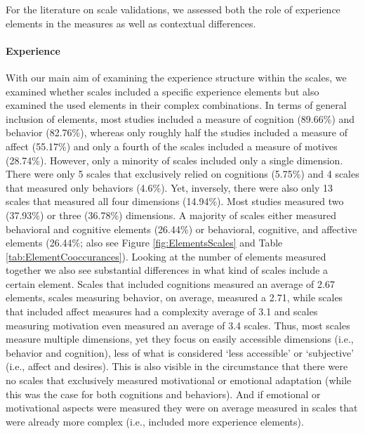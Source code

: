 For the literature on scale validations, we assessed both the role of
experience elements in the measures as well as contextual differences.

\paragraph{Experience}

With our main aim of examining the experience structure within the
scales, we examined whether scales included a specific experience
elements but also examined the used elements in their complex
combinations. In terms of general inclusion of elements, most studies
included a measure of cognition (89.66\%) and behavior (82.76\%),
whereas only roughly half the studies included a measure of affect
(55.17\%) and only a fourth of the scales included a measure of motives
(28.74\%). However, only a minority of scales included only a single
dimension. There were only 5 scales that exclusively relied on
cognitions (5.75\%) and 4 scales that measured only behaviors (4.6\%).
Yet, inversely, there were also only 13 scales that measured all four
dimensions (14.94\%). Most studies measured two (37.93\%) or three
(36.78\%) dimensions. A majority of scales either measured behavioral
and cognitive elements (26.44\%) or behavioral, cognitive, and affective
elements (26.44\%; also see Figure \ref{fig:ElementsScales} and Table
\ref{tab:ElementCooccurances}). Looking at the number of elements
measured together we also see substantial differences in what kind of
scales include a certain element. Scales that included cognitions
measured an average of 2.67 elements, scales measuring behavior, on
average, measured a 2.71, while scales that included affect measures had
a complexity average of 3.1 and scales measuring motivation even
measured an average of 3.4 scales. Thus, most scales measure multiple
dimensions, yet they focus on easily accessible dimensions (i.e.,
behavior and cognition), less of what is considered `less accessible' or
`subjective' (i.e., affect and desires). This is also visible in the
circumstance that there were no scales that exclusively measured
motivational or emotional adaptation (while this was the case for both
cognitions and behaviors). And if emotional or motivational aspects were
measured they were on average measured in scales that were already more
complex (i.e., included more experience elements).

